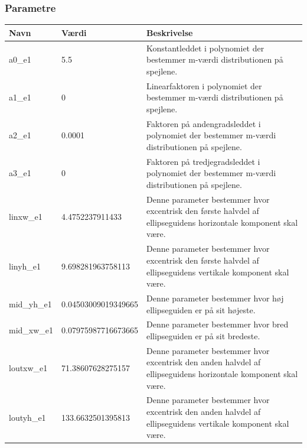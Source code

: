 \documentclass[12pt,oneside,a4paper]{article}
\begin{document}
{{{{{\subsubsection{Parametre} \label{Parametre_EGCGE}
\begin{tabularx}{\textwidth}{l|l|X}
    Navn           & Værdi                & Beskrivelse                                                                                                     \\
    \hline
    \hline
    a0\_e1         & 5.5                  & Konstantleddet i polynomiet der bestemmer m-værdi distributionen på spejlene.                                   \\
    \hline
    a1\_e1         & 0                    & Linearfaktoren i polynomiet der bestemmer m-værdi distributionen på spejlene.                                   \\
    \hline
    a2\_e1         & 0.0001               & Faktoren på andengradsleddet i polynomiet der bestemmer m-værdi distributionen på spejlene.                     \\
    \hline
    a3\_e1         & 0                    & Faktoren på tredjegradsleddet i polynomiet der bestemmer m-værdi distributionen på spejlene.                    \\
    \hline
    linxw\_e1      & 4.4752237911433      & Denne parameter bestemmer hvor excentrisk den første halvdel af ellipseguidens horizontale komponent skal være. \\
    \hline
    linyh\_e1      & 9.698281963758113    & Denne parameter bestemmer hvor excentrisk den første halvdel af ellipseguidens vertikale komponent skal være.   \\
    \hline
    mid\_yh\_e1    & 0.04503009019349665  & Denne parameter bestemmer hvor høj ellipseguiden er på sit højeste.                                             \\
    \hline
    mid\_xw\_e1    & 0.07975987716673665  & Denne parameter bestemmer hvor bred ellipseguiden er på sit bredeste.                                           \\
    \hline
    loutxw\_e1     & 71.38607628275157    & Denne parameter bestemmer hvor excentrisk den anden halvdel af ellipseguidens horizontale komponent skal være.  \\
    \hline
    loutyh\_e1     & 133.6632501395813    & Denne parameter bestemmer hvor excentrisk den anden halvdel af ellipseguidens vertikale komponent skal være.    \\
     

\end{tabularx}}}}}}
\end{document}
